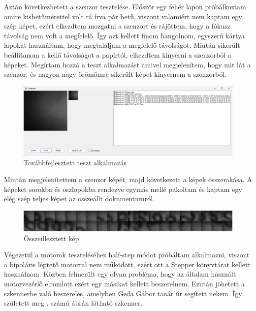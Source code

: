 \documentclass[]{thesis-ekf}
\theoremstyle{definition}
\theoremstyle{remark}
\begin{document}
	Aztán következhetett a szenzor tesztelése. Először egy fehér lapon próbálkoztam amire kisbetűmérettel volt rá írva pár betű, viszont valamiért nem kaptam egy szép képet, ezért elkezdtem mozgatni a szenzort és rájöttem, hogy a fókusz távolság nem volt a megfelelő. Így azt kellett finom hangolnom, egyszerű kártya lapokat használtam, hogy megtaláljam a megfelelő távolságot. Miután sikerült beállítanom a kellő távolságot a papírtól, elkezdtem kinyerni a szenzorból a képeket. Megírtam hozzá a teszt alkalmazást amivel megjelenítem, hogy mit lát a szenzor, és nagyon nagy örömömre sikerült képet kinyernem a szenzorból.
	\begin{figure}[th!]
		\centering
		\includegraphics[width=1\linewidth]{tesztalkalmazas2}
		\caption[Teszt2]{Továbbfejlesztett teszt alkalmazás}
		\label{fig:tesztalkalmazas2}
	\end{figure}
	
	Miután megjelenítettem a szenzor képét, majd következett a képek összerakása. A képeket sorokba és oszlopokba rendezve egymás mellé pakoltam és kaptam egy elég szép teljes képet az összeállt dokumentumról.
	
	\begin{figure}[th!]
		\centering
		\includegraphics[width=0.7\linewidth]{osszeillesztett_tesztkep}
		\caption[Összeillesztett kép]{Összeillesztett kép}
		\label{fig:osszeillesztetttesztkep}
	\end{figure}
	
	Végezetül a motorok teszteléséhez half-step módot próbáltam alkalmazni, viszont a bipoláris léptető motorral nem működött, ezért ott a Stepper\cite{stepper} könyvtárat kellett használnom. Közben felmerült egy olyan probléma, hogy az általam használt motorvezérlő elromlott ezért egy másikat kellett beszerelnem. Ezután jöhetett a szkennerbe való beszerelés, amelyben Geda Gábor tanár úr segített nekem. Így született meg . számú ábrán látható szkenner. 
	
\end{document}

